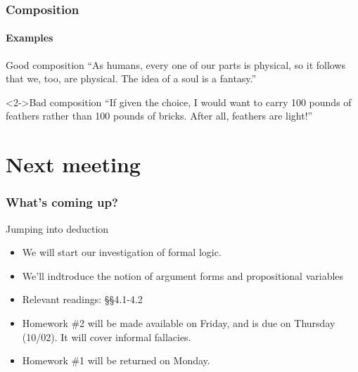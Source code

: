 \documentclass[10pt,letterpaper,xcolor=dvipsnames]{beamer}
\begin{document}
\begin{frame}
  \frametitle{Composition}
  \framesubtitle{Examples}
  
  \begin{block}{Good composition}
    ``As humans, every one of our parts is physical, so it follows that we, too, are physical.  The idea of a soul is a fantasy.''
  \end{block}
  
  \begin{block}<2->{Bad composition}
    ``If given the choice, I would want to carry 100 pounds of feathers rather than 100 pounds of bricks.  After all, feathers are light!''
  \end{block}
  
\end{frame}



\section{Next meeting}

\begin{frame}
  \frametitle{What's coming up?}

  \begin{block}{Jumping into deduction}
    \begin{itemize}
      \item We will start our investigation of formal logic.
      \item We'll indtroduce the notion of argument forms and propositional variables
      \item Relevant readings: \S\S 4.1-4.2
      \item Homework \#2 will be made available on Friday, and is due on Thursday (10/02).  It will cover informal fallacies.
      \item Homework \#1 will be returned on Monday.
    \end{itemize}
  \end{block}
  
\end{frame}
\end{document}
